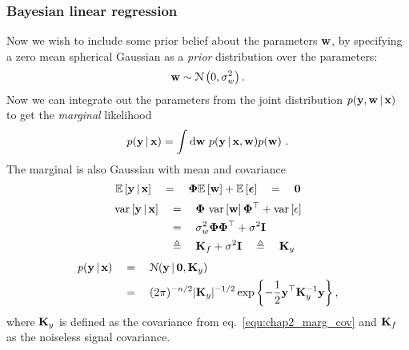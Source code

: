       \subsubsection{Bayesian linear regression}
	Now we wish to include some prior belief about the parameters $\mathbf{w}$, by specifying a zero mean
	spherical Gaussian as a \textit{prior} distribution over the parameters:
	\begin{equation*} \label{equ:chap2_param_prior}
	  \mathbf{w} \sim \mathcal{N} \left( 0, \sigma^2_w \right).
	\end{equation*}
	Now we can integrate out the parameters from the joint distribution
	$p(\mathbf{y},\mathbf{w} \,|\, \mathbf{x})$ to get the \textit{marginal} likelihood
	\begin{equation} \label{equ:chap2_marginal}
	  p( \mathbf{y} \,|\, \mathbf{x} ) = \int \textrm{d}\mathbf{w} ~ p( \mathbf{y} \,|\, \mathbf{x}, \mathbf{w} ) p(\mathbf{w}) ~.
	\end{equation}
	The marginal is also Gaussian with mean and covariance
	\begin{equation} \label{equ:chap2_marg_mean}
	  \mathbb{E}\left[\mathbf{y} \,|\, \mathbf{x}\right] \quad=\quad \mathbf{\Phi} \mathbb{E}\left[\mathbf{w}\right] + \mathbb{E}\left[\boldsymbol{\epsilon}\right] \quad=\quad \mathbf{0}
	\end{equation}
	\begin{align} \label{equ:chap2_marg_cov}
	  \begin{split}
	    \textrm{var}\left[\mathbf{y} \,|\, \mathbf{x}\right] \quad&=\quad \mathbf{\Phi} ~\textrm{var}\left[\mathbf{w}\right] \mathbf{\Phi}^\top + \textrm{var}\left[\epsilon\right] \\
	    &=\quad \sigma^2_w \mathbf{\Phi} \mathbf{\Phi}^\top + \sigma^2 \mathbf{I} \\
	    &\triangleq\quad \mathbf{K}_f + \sigma^2 \mathbf{I} \quad\triangleq\quad \mathbf{K}_y
	  \end{split}
	\end{align}
	\begin{align} \label{equ:chap2_marginal2}
	  \begin{split}
	    p(\mathbf{y} \,|\, \mathbf{x}) \quad &= \quad \mathcal{N}(\mathbf{y} \,|\, \mathbf{0}, \mathbf{K}_y) \\
	    &=\quad (2\pi)^{-n/2} \lvert \mathbf{K}_y \rvert^{-1/2} \exp\left\{-\frac{1}{2} \mathbf{y}^\top \mathbf{K}^{-1}_y \mathbf{y} \right\},
	  \end{split}
	\end{align}
	where $\mathbf{K}_y$ is defined as the covariance from eq.~\eqref{equ:chap2_marg_cov}
	and $\mathbf{K}_f$ as the noiseless signal covariance.
	
